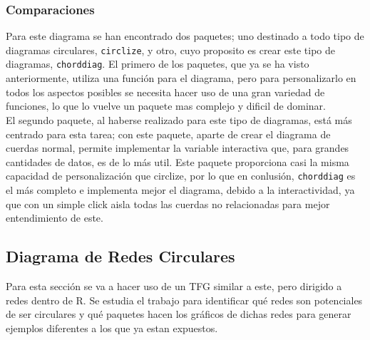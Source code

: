 \documentclass{article}\usepackage[]{graphicx}\usepackage[]{color}
\begin{document}
\subsubsection{Comparaciones}
Para este diagrama se han encontrado dos paquetes; uno destinado a todo tipo de diagramas circulares, \texttt{circlize}, y otro, cuyo proposito es crear este tipo de diagramas, \texttt{chorddiag}. El primero de los paquetes, que ya se ha visto anteriormente, utiliza una funci\'on para el diagrama, pero para personalizarlo en todos los aspectos posibles se necesita hacer uso de una gran variedad de funciones, lo que lo vuelve un paquete mas complejo y dificil de dominar.~\\
El segundo paquete, al haberse realizado para este tipo de diagramas, est\'a m\'as centrado para esta tarea; con este paquete, aparte de crear el diagrama de cuerdas normal, permite implementar la variable interactiva que, para grandes cantidades de datos, es de lo m\'as util. Este paquete proporciona casi la misma capacidad de personalizaci\'on que circlize, por lo que en conlusi\'on, \texttt{chorddiag} es el m\'as completo e implementa mejor el diagrama, debido a la interactividad, ya que con un simple click aisla todas las cuerdas no relacionadas para mejor entendimiento de este.
\clearpage
\subsection{Diagrama de Redes Circulares}\label{ssec:redes}
Para esta secci\'on se va a hacer uso de un TFG %
 similar a este, pero dirigido a redes dentro de R. Se estudia el trabajo para identificar qu\'e redes son potenciales de ser circulares y qu\'e paquetes hacen los gr\'aficos de dichas redes para generar ejemplos diferentes a los que ya estan expuestos.
\end{document}
